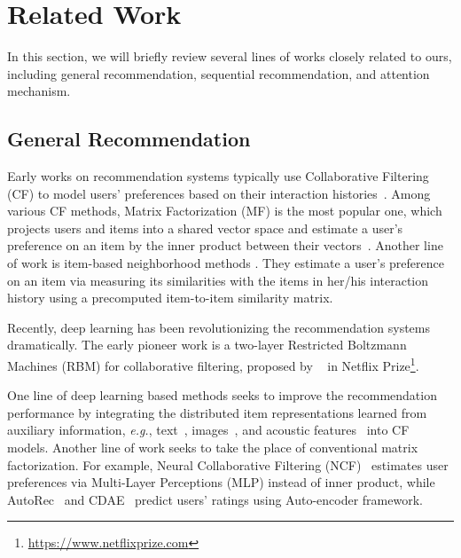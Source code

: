 \section{Related Work}

In this section, we will briefly review several lines of works closely related to ours, including general recommendation, sequential recommendation, and attention mechanism.

\subsection{General Recommendation}

Early works on recommendation systems typically use Collaborative  Filtering (CF) to model users' preferences based on their  interaction histories~\cite{Sarwar:www2001:ICF,Koren:ACF:2011}. Among various CF methods, Matrix Factorization (MF) is the most popular one, which projects users and items into a shared vector space and estimate a user's preference on an item by the inner product between their vectors~\cite{Salakhutdinov:nips2007:PMF,Koren:2009:MFT,Koren:ACF:2011}. Another line of work is item-based neighborhood methods \cite{Sarwar:www2001:ICF,Linden:ieee2003:ARI,Koren:kdd2008:FMN,Kabbur:kdd2013:FFI}. They estimate a user's preference on an item via measuring its similarities with the items in her/his interaction history using a precomputed item-to-item similarity matrix.

Recently, deep learning has been revolutionizing the recommendation systems dramatically. The early pioneer work is a two-layer Restricted Boltzmann Machines (RBM) for collaborative filtering, proposed by \citeauthor{Salakhutdinov:icml2007:RBM}~\cite{Salakhutdinov:icml2007:RBM} in Netflix Prize\footnote{\url{https://www.netflixprize.com}}. 

 One line of deep learning based methods seeks to improve the recommendation performance by integrating the distributed item representations learned from auxiliary information, \textit{e.g.}, text~\cite{Wang:kdd2015:CDL,Kim:recsys2016:CMF}, images~\cite{Wang:www2017:YIR,Kang:icdm2017:Visually}, and acoustic features~\cite{Oord:nips2013:Deep} into CF models. Another line of work seeks to take the place of conventional matrix factorization. For example, Neural Collaborative Filtering (NCF)~\cite{He:www2017:NCF} estimates user preferences via Multi-Layer Perceptions (MLP) instead of inner product, while AutoRec~\cite{Sedhain:www2015:AAM} and CDAE~\cite{Wu:wsdm2016:CDA} predict users' ratings using Auto-encoder framework.


